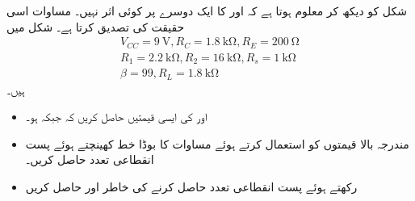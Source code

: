شکل  کو دیکھ کر معلوم ہوتا ہے کہ  اور  کا ایک دوسرے پر کوئی اثر نہیں۔ مساوات  اسی حقیقت کی تصدیق کرتا ہے۔
شکل  میں
\begin{align*}
V_{CC}=\SI{9}{\volt}, R_C=\SI{1.8}{\kilo \ohm}, R_E=\SI{200}{\ohm}\\
R_1=\SI{2.2}{\kilo \ohm}, R_2=\SI{16}{\kilo \ohm}, R_s=\SI{1}{\kilo \ohm}\\
\beta=\num{99}, R_L=\SI{1.8}{\kilo \ohm}
\end{align*}
ہیں۔
\begin{itemize}
\item
{} اور  کی ایسی قیمتیں حاصل کریں کہ  جبکہ   ہو۔
\item
مندرجہ بالا قیمتوں کو استعمال کرتے ہوئے  مساوات  کا بوڈا خط کھینچتے ہوئے  پست انقطاعی تعدد حاصل کریں۔
\item
{} رکھتے ہوئے پست انقطاعی تعدد  حاصل کرنے کی خاطر  اور  حاصل کریں
\end{itemize}

